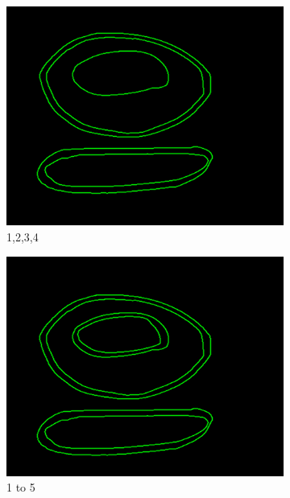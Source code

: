 \documentclass[11pt]{article}
\begin{document}
\begin{figure}
	
	\begin{subfigure}[t]{0.32\textwidth}
	\centering
		\includegraphics[scale=0.28]{pics/elimination/joinedAfterRemoval4.png}
		\caption{1,2,3,4}
		\label{construction4}
	\end{subfigure}
	\begin{subfigure}[t]{0.32\textwidth}
	\centering
		\includegraphics[scale=0.28]{pics/elimination/joinedAfterRemoval5.png}
		\caption{1 to 5}
		\label{construction5}
	\end{subfigure}
	\begin{subfigure}[t]{0.32\textwidth}
	\centering

\end{subfigure}
\end{figure}
\end{document}
